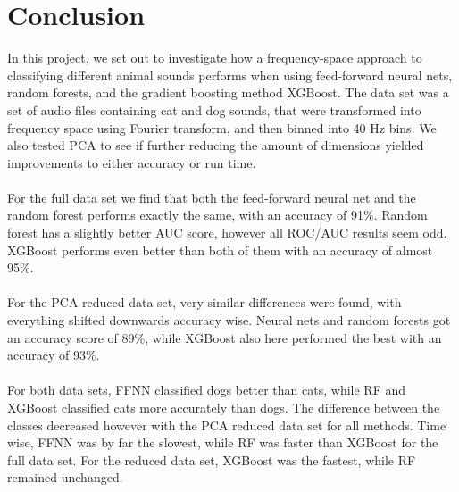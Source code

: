 \documentclass[a4paper]{article}
\newcommand\red[1]{\textcolor{red}{\textbf{#1}}}
\newcommand{\Nepochs}{N_{\text{epochs}}}
\begin{document}
\section{Conclusion} \label{chap:conclusion}
In this project, we set out to investigate how a frequency-space approach to classifying different animal sounds performs when using feed-forward neural nets, random forests, and the gradient boosting method XGBoost. The data set was a set of audio files containing cat and dog sounds, that were transformed into frequency space using Fourier transform, and then binned into 40 Hz bins. We also tested PCA to see if further reducing the amount of dimensions yielded improvements to either accuracy or run time.
\\\\
For the full data set we find that both the feed-forward neural net and the random forest performs exactly the same, with an accuracy of 91\%. Random forest has a slightly better AUC score, however all ROC/AUC results seem odd. XGBoost performs even better than both of them with an accuracy of almost 95\%.
\\\\
For the PCA reduced data set, very similar differences were found, with everything shifted downwards accuracy wise. Neural nets and random forests got an accuracy score of 89\%, while XGBoost also here performed the best with an accuracy of 93\%.
\\\\
For both data sets, FFNN classified dogs better than cats, while RF and XGBoost classified cats more accurately than dogs. The difference between the classes decreased however with the PCA reduced data set for all methods. Time wise, FFNN was by far the slowest, while RF was faster than XGBoost for the full data set. For the reduced data set, XGBoost was the fastest, while RF remained unchanged.
\end{document}
